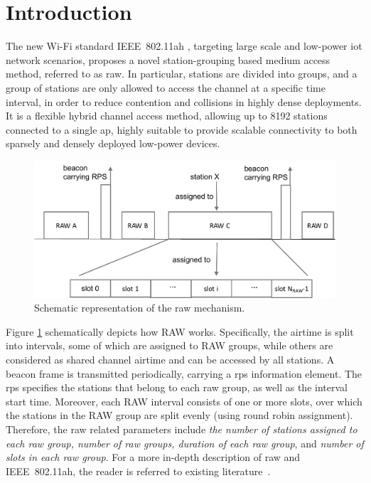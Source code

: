 \section{Introduction}

The new Wi-Fi standard IEEE~802.11ah \cite{80211ahStd}, targeting large scale and low-power \gls{iot} network scenarios, proposes a novel station-grouping based medium access method, referred to as \gls{raw}. In particular, stations are divided into groups, and a group of stations are only allowed to access the channel at a specific time interval, in order to reduce contention and collisions in highly dense deployments. It is a flexible hybrid channel access method, allowing up to 8192 stations connected to a single \gls{ap}, highly suitable to provide scalable connectivity to both sparsely and densely deployed low-power devices. 


\begin{figure}[t]
  \centering
  \includegraphics[width=0.8\columnwidth]{figures/raw}
  \caption{Schematic representation of the \gls{raw} mechanism.\label{fig:RAW}}
\end{figure}


Figure \ref{fig:RAW} schematically depicts how RAW works. Specifically, the airtime is split into intervals, some of which are assigned to RAW groups, while others are considered as shared channel airtime and can be accessed by all stations. A beacon frame is transmitted periodically, carrying a \gls{rps} information element. The \gls{rps} specifies the stations that belong to each \gls{raw} group, as well as the interval start time. Moreover, each RAW interval consists of one or more slots, over which the stations in the RAW group are split evenly (using round robin assignment). Therefore, the \gls{raw} related parameters include \textit{ the number of stations assigned to each \gls{raw} group, number of \gls{raw} groups, duration of each \gls{raw} group}, and  \textit{number of slots in each \gls{raw} group}. For a more in-depth description of \gls{raw} and IEEE~802.11ah, the reader is referred to existing literature~\cite{80211ahStd, Khorov2015a, sensors80211ah}.

